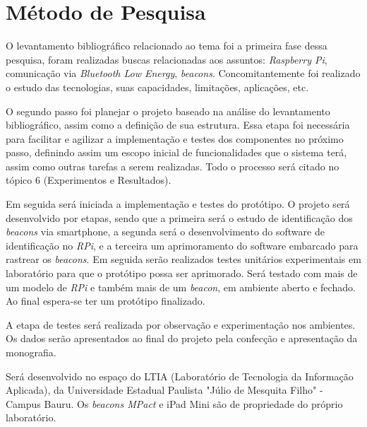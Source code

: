 \documentclass[
	12pt,				%
	openright,			%
	oneside,			%
	a4paper,			%
	chapter=TITLE,		%
	english,			%
	brazil				%
	]{abntex2}
\begin{document}
{%


\chapter{Método de Pesquisa}

O levantamento bibliográfico relacionado ao tema foi a primeira fase dessa pesquisa, foram realizadas buscas relacionadas aos assuntos: \textit{Raspberry Pi}, comunicação via \textit{Bluetooth Low Energy}, \textit{beacons}. Concomitantemente foi realizado o estudo das tecnologias, suas capacidades, limitações, aplicações, etc.

O segundo passo foi planejar o projeto baseado na análise do levantamento bibliográfico, assim como a definição de sua estrutura. Essa etapa foi necessária para facilitar e agilizar a implementação e testes dos componentes no próximo passo, definindo assim um escopo inicial de funcionalidades que o sistema terá, assim como outras tarefas a serem realizadas. Todo o processo será citado no tópico 6 (Experimentos e Resultados).

Em seguida será iniciada a implementação e testes do protótipo. O projeto será desenvolvido por etapas, sendo que a primeira será o estudo de identificação dos \textit{beacons} via smartphone, a segunda será o desenvolvimento do software de identificação no \textit{RPi}, e a terceira um aprimoramento do software embarcado para rastrear os \textit{beacons}. Em seguida serão realizados testes unitários experimentais em laboratório para que o protótipo possa ser aprimorado. Será testado com mais de um modelo de \textit{RPi} e também mais de um \textit{beacon}, em ambiente aberto e fechado. Ao final espera-se ter um protótipo finalizado.

A etapa de testes será realizada por observação e experimentação nos ambientes. Os dados serão apresentados ao final do projeto pela confecção e apresentação da monografia.

Será desenvolvido no espaço do LTIA (Laboratório de Tecnologia da Informação Aplicada), da Universidade Estadual Paulista "Júlio de Mesquita Filho" - Campus Bauru. Os \textit{beacons MPact} e iPad Mini são de propriedade do próprio laboratório.



}
\end{document}
